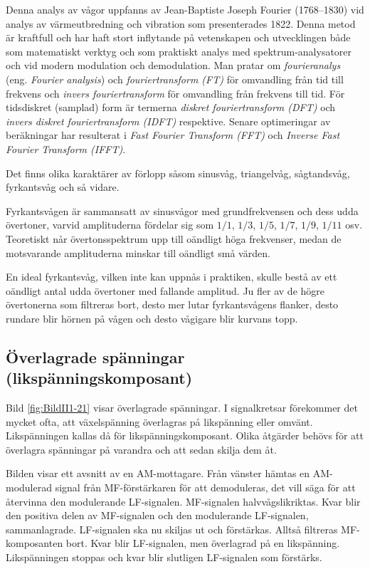 Denna analys av vågor uppfanns av Jean-Baptiste Joseph Fourier (1768--1830)
vid analys av värmeutbredning och vibration som presenterades 1822.
Denna metod är kraftfull och har haft stort inflytande på vetenskapen och
utvecklingen både som matematiskt verktyg och som praktiskt analys med
spektrum-analysatorer och vid modern modulation och demodulation.
Man pratar om \emph{fourieranalys} (eng. \emph{Fourier analysis}) och
\emph{fouriertransform (FT)} för omvandling från tid till frekvens och
\emph{invers fouriertransform} för omvandling från frekvens till tid.
För tidsdiskret (samplad) form är termerna
\emph{diskret fouriertransform (DFT)} och
\emph{invers diskret fouriertransform (IDFT)} respektive.
Senare optimeringar av beräkningar har resulterat i
\emph{Fast Fourier Transform (FFT)} och
\emph{Inverse Fast Fourier Transform (IFFT)}.

Det finns olika karaktärer av förlopp såsom sinusvåg, triangelvåg, sågtandsvåg,
fyrkantsvåg och så vidare.

Fyrkantsvågen är sammansatt av sinusvågor med grundfrekvensen och dess udda
övertoner, varvid amplituderna fördelar sig som \(1/1\), \(1/3\), \(1/5\),
\(1/7\), \(1/9\), \(1/11\) osv.
Teoretiskt når övertonsspektrum upp till oändligt höga frekvenser, medan de
motsvarande amplituderna minskar till oändligt små värden.

En ideal fyrkantsvåg, vilken inte kan uppnås i praktiken, skulle bestå av ett
oändligt antal udda övertoner med fallande amplitud.
Ju fler av de högre övertonerna som filtreras bort, desto mer lutar
fyrkantsvågens flanker, desto rundare blir hörnen på vågen och desto vågigare
blir kurvans topp.

\subsection{Överlagrade spänningar (likspänningskomposant)}

Bild \ref{fig:BildII1-21} visar överlagrade spänningar.
I signalkretsar förekommer det mycket ofta, att växelspänning överlagras på
likspänning eller omvänt.
Likspänningen kallas då för likspänningskomposant.
Olika åtgärder behövs för att överlagra spänningar på varandra och att sedan
skilja dem åt.

Bilden visar ett avsnitt av en AM-mottagare.
Från vänster hämtas en AM-modulerad signal från MF-förstärkaren för att
demoduleras, det vill säga för att återvinna den modulerande LF-signalen.
MF-signalen halvvågslikriktas.
Kvar blir den positiva delen av MF-signalen och den modulerande LF-signalen,
sammanlagrade.
LF-signalen ska nu skiljas ut och förstärkas.
Alltså filtreras MF-komposanten bort.
Kvar blir LF-signalen, men överlagrad på en likspänning.
Likspänningen stoppas och kvar blir slutligen LF-signalen som förstärks.

